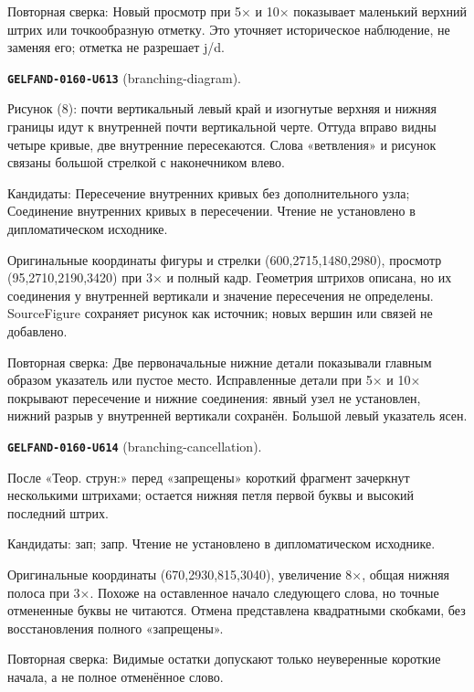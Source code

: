 Повторная сверка: Новый просмотр при 5× и 10× показывает маленький верхний штрих или точкообразную отметку. Это уточняет историческое наблюдение, не заменяя его; отметка не разрешает j/d.\par\medskip
\par\noindent\leavevmode{}\label{GELFAND-0160-U613}\label{GELFAND-P001484:branching-diagram}\textbf{\texttt{GELFAND-0160-U613}} (branching-diagram).\nopagebreak[4]\par
Рисунок (8): почти вертикальный левый край и изогнутые верхняя и нижняя границы идут к внутренней почти вертикальной черте. Оттуда вправо видны четыре кривые, две внутренние пересекаются. Слова «ветвления» и рисунок связаны большой стрелкой с наконечником влево.\par
Кандидаты: Пересечение внутренних кривых без дополнительного узла; Соединение внутренних кривых в пересечении. Чтение не установлено в дипломатическом исходнике.\par
Оригинальные координаты фигуры и стрелки (600,2715,1480,2980), просмотр (95,2710,2190,3420) при 3× и полный кадр. Геометрия штрихов описана, но их соединения у внутренней вертикали и значение пересечения не определены. SourceFigure сохраняет рисунок как источник; новых вершин или связей не добавлено.\par
Повторная сверка: Две первоначальные нижние детали показывали главным образом указатель или пустое место. Исправленные детали при 5× и 10× покрывают пересечение и нижние соединения: явный узел не установлен, нижний разрыв у внутренней вертикали сохранён. Большой левый указатель ясен.\par\medskip
\par\noindent\leavevmode{}\label{GELFAND-0160-U614}\label{GELFAND-P001484:branching-cancellation}\textbf{\texttt{GELFAND-0160-U614}} (branching-cancellation).\nopagebreak[4]\par
После «Теор. струн:» перед «запрещены» короткий фрагмент зачеркнут несколькими штрихами; остается нижняя петля первой буквы и высокий последний штрих.\par
Кандидаты: зап; запр. Чтение не установлено в дипломатическом исходнике.\par
Оригинальные координаты (670,2930,815,3040), увеличение 8×, общая нижняя полоса при 3×. Похоже на оставленное начало следующего слова, но точные отмененные буквы не читаются. Отмена представлена квадратными скобками, без восстановления полного «запрещены».\par
Повторная сверка: Видимые остатки допускают только неуверенные короткие начала, а не полное отменённое слово.\par\medskip
